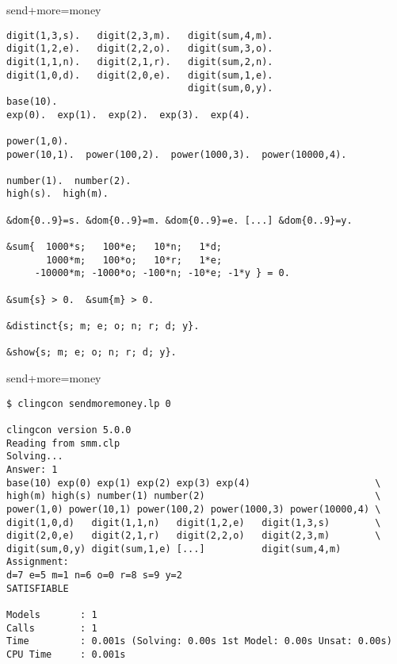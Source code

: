 \begin{frame}[fragile,shrink=1]{send+more=money}
\begin{lstlisting}
digit(1,3,s).   digit(2,3,m).   digit(sum,4,m).
digit(1,2,e).   digit(2,2,o).   digit(sum,3,o).
digit(1,1,n).   digit(2,1,r).   digit(sum,2,n).
digit(1,0,d).   digit(2,0,e).   digit(sum,1,e).
                                digit(sum,0,y).
base(10).
exp(0).  exp(1).  exp(2).  exp(3).  exp(4).

power(1,0).
power(10,1).  power(100,2).  power(1000,3).  power(10000,4).

number(1).  number(2).
high(s).  high(m).

&dom{0..9}=s. &dom{0..9}=m. &dom{0..9}=e. [...] &dom{0..9}=y.

&sum{  1000*s;   100*e;   10*n;   1*d;
       1000*m;   100*o;   10*r;   1*e;
     -10000*m; -1000*o; -100*n; -10*e; -1*y } = 0.

&sum{s} > 0.  &sum{m} > 0.

&distinct{s; m; e; o; n; r; d; y}.

&show{s; m; e; o; n; r; d; y}.
\end{lstlisting}
\end{frame}
\begin{frame}[fragile]{send+more=money}
\scriptsize\medskip
\begin{lstlisting}
$ clingcon sendmoremoney.lp 0

clingcon version 5.0.0
Reading from smm.clp
Solving...
Answer: 1
base(10) exp(0) exp(1) exp(2) exp(3) exp(4)                      \
high(m) high(s) number(1) number(2)                              \
power(1,0) power(10,1) power(100,2) power(1000,3) power(10000,4) \
digit(1,0,d)   digit(1,1,n)   digit(1,2,e)   digit(1,3,s)        \
digit(2,0,e)   digit(2,1,r)   digit(2,2,o)   digit(2,3,m)        \
digit(sum,0,y) digit(sum,1,e) [...]          digit(sum,4,m)
Assignment:
d=7 e=5 m=1 n=6 o=0 r=8 s=9 y=2
SATISFIABLE

Models       : 1
Calls        : 1
Time         : 0.001s (Solving: 0.00s 1st Model: 0.00s Unsat: 0.00s)
CPU Time     : 0.001s
\end{lstlisting}
\end{frame}
%
